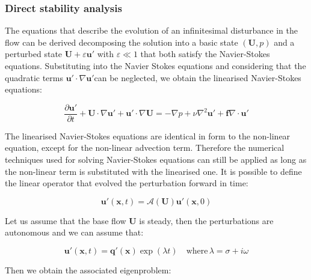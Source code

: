 \subsubsection{Direct stability analysis}


The equations that describe the evolution of an infinitesimal disturbance in the flow can be derived decomposing the solution into a basic state $(\mathbf{U}, p)$ and a perturbed state  $\mathbf{U}+\varepsilon \mathbf{u'}$ with $\varepsilon \ll 1$ that both satisfy the Navier-Stokes equations. Substituting into the Navier Stokes equations and considering that the quadratic terms $\mathbf{u'} \cdot \nabla \mathbf{u'}$can be neglected, we obtain the linearised Navier-Stokes equations:

\begin{subequations}
\begin{equation}
  \frac{\partial \mathbf{u'}}{\partial t} + \mathbf{U} \cdot  \nabla \mathbf{u'}+\mathbf{u'} \cdot \nabla \mathbf{U} = -\nabla p + \nu \nabla^2 \mathbf{u'} + \mathbf{f}
\end{equation}

\begin{equation}
\nabla \cdot \mathbf{u'}
\end{equation}

\end{subequations}



The linearised Navier-Stokes equations are identical in form to the non-linear equation, except for the non-linear advection term. Therefore the numerical techniques used for solving Navier-Stokes equations can still be applied as long as the non-linear term is substituted with the linearised one. It is possible to define the linear operator that evolved the perturbation forward in time:

\begin{equation}
   \mathbf{u'}(\mathbf{x},t)=\mathcal{A}(\mathbf{U})\mathbf{u'}(\mathbf{x},0)
\end{equation}

Let us assume that the base flow  $\mathbf{U}$ is steady, then the perturbations are autonomous and we can assume that:

\begin{equation}
   \mathbf{u'}(\mathbf{x},t)=\mathbf{q'}(\mathbf{x})\exp(\lambda t) \quad \mbox{where} \, \lambda=\sigma+i \omega
\end{equation}

Then we obtain the associated eigenproblem:

